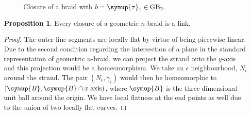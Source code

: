 \documentclass[oneside]{book}
\newcommand{\GB}{\text{GB}}
\newcommand{\tauu}{\symup{\tau}}
\theoremstyle{definition}
\newtheorem{prop}[thm]{Proposition}
\begin{document}
	\begin{figure}[H]\centering
		\quad\quad{}
		\caption{Closure of a braid with \(b = \tauu_1 \in \GB_2\).}
		\label{fig:closure}
	\end{figure}

	\begin{prop}
		Every closure of a geometric \(n\)-braid is a link.
	\end{prop}
	\begin{proof}[Proof]
		The outer line segments are locally flat by virtue of being piecewise linear. Due to the second condition regarding the intersection of a plane in the standard representation of geometric \(n\)-braid, we can project the strand onto the \(y\)-axis and this projection would be a homeomorphism. We take an \(\epsilon\) neighbourhood, \(N_\epsilon\) around the strand. The pair \((N_\epsilon, \gamma_i)\) would then be homeomorphic to \((\symup{B}, \symup{B} \cap x\text{-axis})\), where \(\symup{B}\) is the three-dimensional unit ball around the origin. We have local flatness at the end points as well due to the union of two locally flat curves.
	\end{proof}
\end{document}
